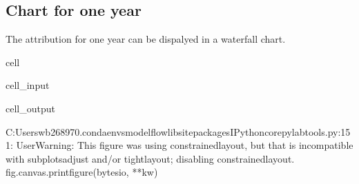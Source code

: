 \documentclass[letterpaper,10pt,english]{jupyterBook}
\begin{document}
\subsection{Chart for one year}
\label{\detokenize{content/06_ModelAnalytics/Attribution:chart-for-one-year}}
\sphinxAtStartPar
The attribution for one year can be dispalyed in a waterfall chart.

\begin{sphinxuseclass}{cell}\begin{sphinxVerbatimInput}

\begin{sphinxuseclass}{cell_input}
\begin{sphinxVerbatim}[commandchars=\\\{\}]
 
\end{sphinxVerbatim}

\end{sphinxuseclass}\end{sphinxVerbatimInput}
\begin{sphinxVerbatimOutput}

\begin{sphinxuseclass}{cell_output}
\begin{sphinxVerbatim}[commandchars=\\\{\}]
C:\PYGZbs{}Users\PYGZbs{}wb268970\PYGZbs{}.conda\PYGZbs{}envs\PYGZbs{}modelflow\PYGZbs{}lib\PYGZbs{}site\PYGZhy{}packages\PYGZbs{}IPython\PYGZbs{}core\PYGZbs{}pylabtools.py:151: UserWarning: This figure was using constrained\PYGZus{}layout, but that is incompatible with subplots\PYGZus{}adjust and/or tight\PYGZus{}layout; disabling constrained\PYGZus{}layout.
  fig.canvas.print\PYGZus{}figure(bytes\PYGZus{}io, **kw)
\end{sphinxVerbatim}

\noindent{}

\end{sphinxuseclass}\end{sphinxVerbatimOutput}

\end{sphinxuseclass}
\end{document}
